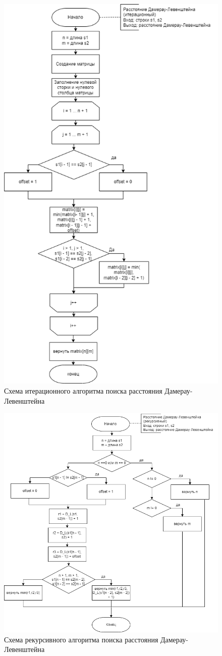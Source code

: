 \documentclass[a4paper,14pt, unknownkeysallowed]{extreport}
\begin{document}
	\begin{figure}
		\centering
		\includegraphics[width=0.7\linewidth]{DamLev}
		\caption{Схема итерационного алгоритма поиска расстояния Дамерау-Левенштейна}
		\label{fig:schema_bucket_2}
	\end{figure}
	
	\begin{figure}
		\centering
		\includegraphics[width=1\linewidth]{DamLevRec}
		\caption{Схема рекурсивного алгоритма поиска расстояния Дамерау-Левенштейна}
		\label{fig:schema_selection}
	\end{figure}
	
\end{document}
